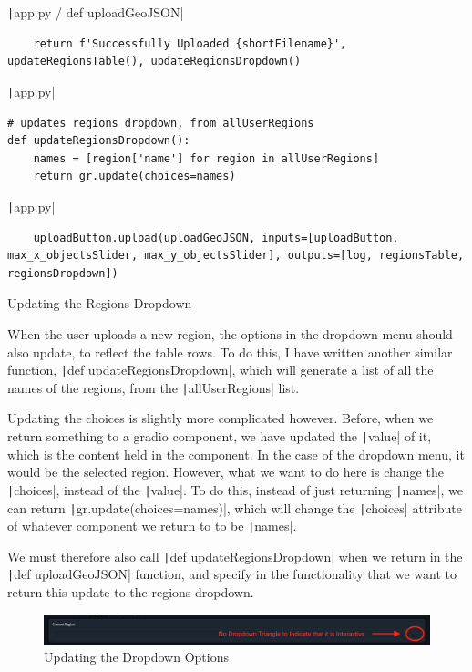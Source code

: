 \documentclass[12pt]{report}
\newcommand{\pil}[1]{\protect\texttt|#1|}
\begin{document}
\begin{listing}[H]
\pil{app.py / def uploadGeoJSON}
\begin{verbatim}
    return f'Successfully Uploaded {shortFilename}', updateRegionsTable(), updateRegionsDropdown()
\end{verbatim}
\pil{app.py}
\begin{verbatim}
# updates regions dropdown, from allUserRegions
def updateRegionsDropdown():
    names = [region['name'] for region in allUserRegions]
    return gr.update(choices=names)
\end{verbatim}
\pil{app.py}
\begin{verbatim}
    uploadButton.upload(uploadGeoJSON, inputs=[uploadButton, max_x_objectsSlider, max_y_objectsSlider], outputs=[log, regionsTable, regionsDropdown])
\end{verbatim}
\caption{Updating the Regions Dropdown}\label{cs:updateRegionsDropdown}
\end{listing}

When the user uploads a new region, the options in the dropdown menu should also update, to reflect the table rows. To do this, I have written another similar function, \pil{def updateRegionsDropdown}, which will generate a list of all the names of the regions, from the \pil{allUserRegions} list.

Updating the choices is slightly more complicated however. Before, when we return something to a gradio component, we have updated the \pil{value} of it, which is the content held in the component. In the case of the dropdown menu, it would be the selected region. However, what we want to do here is change the \pil{choices}, instead of the \pil{value}. To do this, instead of just returning \pil{names}, we can return \pil{gr.update(choices=names)}, which will change the \pil{choices} attribute of whatever component we return to to be \pil{names}.

We must therefore also call \pil{def updateRegionsDropdown} when we return in the \pil{def uploadGeoJSON} function, and specify in the functionality that we want to return this update to the regions dropdown.

\begin{figure}[H]
\centering
\includegraphics[width=16cm]{ss20.4.png}
\caption{Updating the Dropdown Options}\label{fig:ss20.4}
\end{figure}
\end{document}
